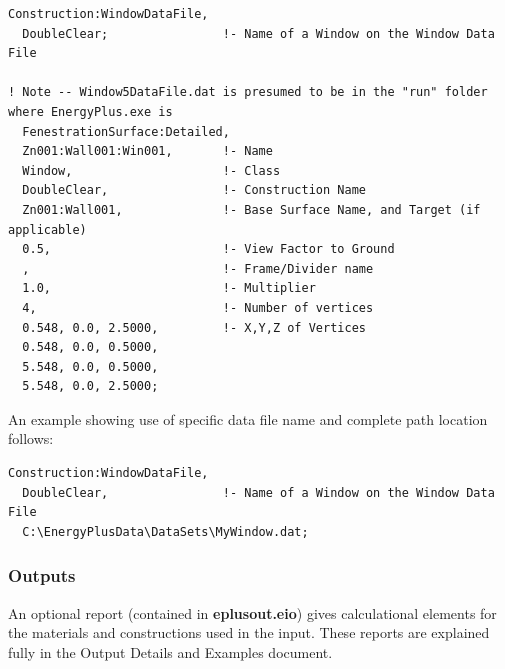 \begin{lstlisting}
Construction:WindowDataFile,
  DoubleClear;                !- Name of a Window on the Window Data File

! Note -- Window5DataFile.dat is presumed to be in the "run" folder where EnergyPlus.exe is
  FenestrationSurface:Detailed,
  Zn001:Wall001:Win001,       !- Name
  Window,                     !- Class
  DoubleClear,                !- Construction Name
  Zn001:Wall001,              !- Base Surface Name, and Target (if applicable)
  0.5,                        !- View Factor to Ground
  ,                           !- Frame/Divider name
  1.0,                        !- Multiplier
  4,                          !- Number of vertices
  0.548, 0.0, 2.5000,         !- X,Y,Z of Vertices
  0.548, 0.0, 0.5000,
  5.548, 0.0, 0.5000,
  5.548, 0.0, 2.5000;
\end{lstlisting}

An example showing use of specific data file name and complete path location follows:

\begin{lstlisting}
Construction:WindowDataFile,
  DoubleClear,                !- Name of a Window on the Window Data File
  C:\EnergyPlusData\DataSets\MyWindow.dat;
\end{lstlisting}

\subsubsection{Outputs}\label{outputs-4-016}

An optional report (contained in \textbf{eplusout.eio}) gives calculational elements for the materials and constructions used in the input. These reports are explained fully in the Output Details and Examples document.

